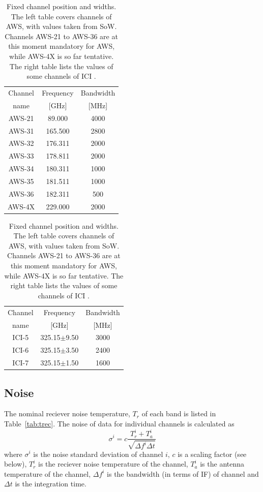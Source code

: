 \documentclass[12pt]{article}
\begin{document}
\begin{table}[!b]
  \begin{minipage}[b]{0.5\linewidth}
  \centering  
  \begin{tabular}[c]{c|c|c}
    Channel & Frequency   & Bandwidth \\
    name    & [GHz] &  [MHz] \\
    \hline
    AWS-21  & \phantom{0}89.000 & 4000\\
    AWS-31  & 165.500 & 2800\\
    AWS-32  & 176.311 & 2000\\
    AWS-33  & 178.811 & 2000\\
    AWS-34  & 180.311 & 1000\\
    AWS-35  & 181.511 & 1000\\
    AWS-36  & 182.311 & \phantom{0}500\\
    AWS-4X  & 229.000 & 2000\\
    \hline
  \end{tabular}
  \end{minipage}%
  \begin{minipage}[b]{0.5\linewidth}
  \centering  
  \begin{tabular}[c]{c|c|c}
    Channel & Frequency   & Bandwidth \\
    name    & [GHz] &  [MHz] \\
    \hline
    ICI-5  & 325.15$\pm$9.50 & 3000\\
    ICI-6  & 325.15$\pm$3.50 & 2400\\
    ICI-7  & 325.15$\pm$1.50 & 1600\\
    \hline
  \end{tabular}
  \end{minipage}  
  \caption{Fixed channel position and widths. The left table covers channels of
    AWS, with values taken from SoW. Channels AWS-21 to AWS-36 are at this
    moment mandatory for AWS, while AWS-4X is so far tentative. The right table
    lists the values of some channels of ICI \citep{eriksson:towar:20}.}
  \label{tab:fixed:chs}
\end{table}


\subsection{Noise}
%
The nominal reciever noise temperature, $T_r$ of each band is listed in
Table~\ref{tab:trec}. The noise of data for individual channels is calculated
as
\begin{equation}
  \sigma^i = c \frac{T^i_r+T^i_a}{\sqrt{\Delta\!f^i\Delta t}}
  \label{eq:noise}
\end{equation}
where $\sigma^i$ is the noise standard deviation of channel $i$, $c$ is a
scaling factor (see below), $T^i_r$ is the reciever noise temperature of the
channel, $T^i_a$ is the antenna temperature of the channel, $\Delta\!f^i$ is
the bandwidth (in terms of IF) of channel and $\Delta t$ is the integration
time.
\end{document}
